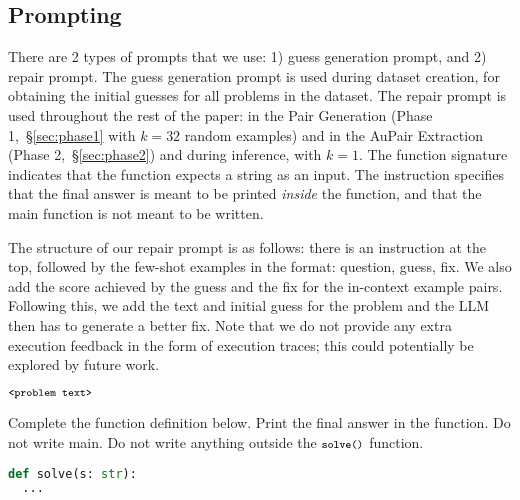 \documentclass[11pt, a4paper, logo, copyright]{googledeepmind}
\def\aupair/{\textcolor{golden}{Au}Pair}
\begin{document}
\subsection{Prompting}\label{sec:prompting}

There are 2 types of prompts that we use: 1) guess generation prompt, and 2) repair prompt. The guess generation prompt is used during dataset creation, for obtaining the initial guesses for all problems in the dataset. The repair prompt is used throughout the rest of the paper: in the Pair Generation (Phase 1,~\S\ref{sec:phase1} with $k=32$ random examples) and in the \aupair/ Extraction (Phase 2,~\S\ref{sec:phase2}) and during inference, with $k=1$. The function signature indicates that the function expects a string as an input. The instruction specifies that the final answer is meant to be printed \emph{inside} the function, and that the main function is not meant to be written.

The structure of our repair prompt is as follows: there is an instruction at the top, followed by the few-shot examples in the format: question, guess, fix. We also add the score achieved by the guess and the fix for the in-context example pairs. Following this, we add the text and initial guess for the problem and the LLM then has to generate a better fix.  Note that we do not provide any extra execution feedback in the form of execution traces; this could potentially be explored by future work.

\begin{tcolorbox}[colback=blue!5!white,colframe=black,title= Guess Generation Prompt,fonttitle=\bfseries]

$\texttt{\footnotesize <problem text>}$

Complete the function definition below. Print the final answer in the function. Do not write main. Do not write anything outside the $\texttt{\footnotesize solve()}$ function. 

\begin{lstlisting}[language=Python,basicstyle=\footnotesize\ttfamily]
def solve(s: str):
  ...
\end{lstlisting}

\end{tcolorbox}
\end{document}
